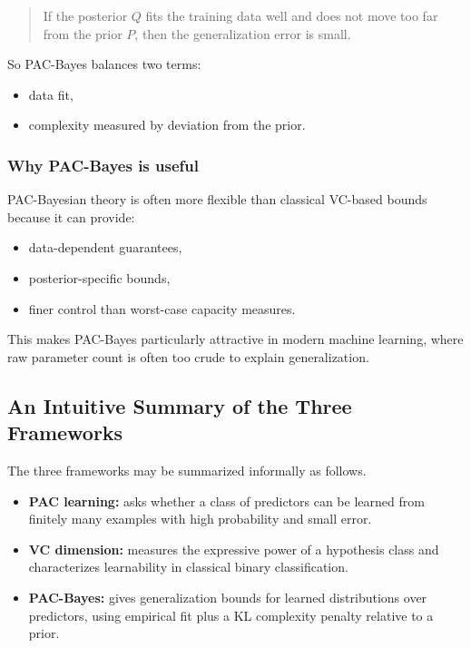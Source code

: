 \begin{quote}
If the posterior \(Q\) fits the training data well and does not move too far from the prior \(P\), then the generalization error is small.
\end{quote}

So PAC-Bayes balances two terms:
\begin{itemize}
    \item data fit,
    \item complexity measured by deviation from the prior.
\end{itemize}

\subsubsection{Why PAC-Bayes is useful}

PAC-Bayesian theory is often more flexible than classical VC-based bounds because it can provide:
\begin{itemize}
    \item data-dependent guarantees,
    \item posterior-specific bounds,
    \item finer control than worst-case capacity measures.
\end{itemize}

This makes PAC-Bayes particularly attractive in modern machine learning, where raw parameter count is often too crude to explain generalization.

\subsection{An Intuitive Summary of the Three Frameworks}

The three frameworks may be summarized informally as follows.

\begin{itemize}
    \item \textbf{PAC learning:} asks whether a class of predictors can be learned from finitely many examples with high probability and small error.
    \item \textbf{VC dimension:} measures the expressive power of a hypothesis class and characterizes learnability in classical binary classification.
    \item \textbf{PAC-Bayes:} gives generalization bounds for learned distributions over predictors, using empirical fit plus a KL complexity penalty relative to a prior.
\end{itemize}


